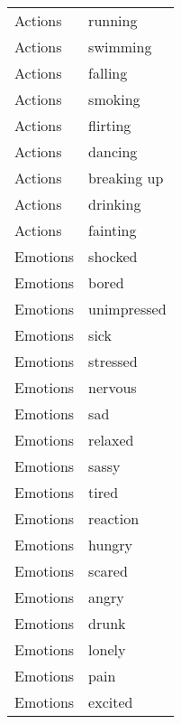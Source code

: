 \begin{supertabular}{l p{0.25\textwidth}}
          Actions &                            running \\
          Actions &                           swimming \\
          Actions &                            falling \\
          Actions &                            smoking \\
          Actions &                           flirting \\
          Actions &                            dancing \\
          Actions &                        breaking up \\
          Actions &                           drinking \\
          Actions &                           fainting \\
         Emotions &                            shocked \\
         Emotions &                              bored \\
         Emotions &                        unimpressed \\
         Emotions &                               sick \\
         Emotions &                           stressed \\
         Emotions &                            nervous \\
         Emotions &                                sad \\
         Emotions &                            relaxed \\
         Emotions &                              sassy \\
         Emotions &                              tired \\
         Emotions &                           reaction \\
         Emotions &                             hungry \\
         Emotions &                             scared \\
         Emotions &                              angry \\
         Emotions &                              drunk \\
         Emotions &                             lonely \\
         Emotions &                               pain \\
         Emotions &                            excited \\

\end{supertabular}
